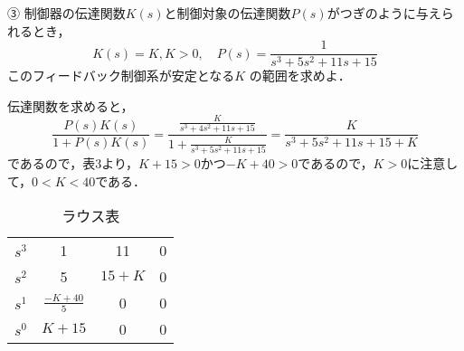 ③ 制御器の伝達関数$K(s)$と制御対象の伝達関数$P(s)$がつぎのように与えられるとき，
$$
K(s)=K, K>0, \quad P(s)=\frac{1}{s^3+5 s^2+11 s+15}
$$
このフィードバック制御系が安定となる$K$ の範囲を求めよ．


伝達関数を求めると，
$$
\frac{P(s) K(s)}{1+P(s) K(s)}=\frac{\frac{K}{s^3+4 s^2+11 s+15}}{1+\frac{K}{s^3+5 s^2+11 s+15}}=\frac{K}{s^3+5 s^2+11 s+15+K}
$$
であるので，表3より，$K+15>0$かつ$-K+40>0$であるので，$K>0$に注意して，$0<K<40$である．

\begin{table}[H]
    \centering
    \begin{tabular}{c|ccc}
        \hline
        $s^3$ & 1 & 11 & 0 \\
        $s^2$ & 5 & $15+K$ & 0 \\
        $s^1$ & $\frac{-K+40}{5}$ & 0 & 0 \\
        $s^0$ & $K+15$ & 0 & 0 \\ \hline
        
    \end{tabular}
    \caption{ラウス表}
\end{table}

\newpage

